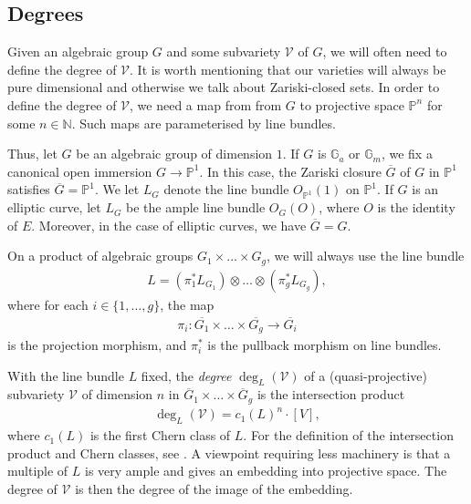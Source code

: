 \documentclass[12pt, reqno]{amsart}
\newcommand{\G}{\mathbb{G}}
\renewcommand{\P}{\mathbb{P}}
\theoremstyle{remark}
\theoremstyle{definition}
\numberwithin{equation}{section}
\begin{document}
\subsection{Degrees}\label{degrees}

Given an algebraic group $G$ and some subvariety $\mathcal{V}$ of $G$, we will often need to define the degree of $\mathcal{V}$. It is worth mentioning that our varieties will always be pure dimensional and otherwise we talk about Zariski-closed sets. In order to define the degree of $\mathcal{V}$, we need a map from from $G$ to projective space $\mathbb{P}^n$ for some $n \in \mathbb{N}$. Such maps are parameterised by line bundles.

Thus, let $G$ be an algebraic group of dimension $1$. If $G$ is $\G_a$ or $\G_m$, we fix a canonical open immersion $G \to \P^1$. In this case, the Zariski closure $\overline{G}$ of $G$ in $\mathbb{P}^1$ satisfies $\overline{G} = \mathbb{P}^1$. We let $L_G$ denote the line bundle $O_{\P^1}(1)$ on $\P^1$. If $G$ is an elliptic curve, let $L_G$ be the ample line bundle $O_G(O)$, where $O$ is the identity of $E$. Moreover, in the case of elliptic curves, we have $\overline{G} = G$.


On a product of algebraic groups $G_1 \times \dots \times G_g$, we will always use the line bundle
\begin{align*}
  L=   (\pi_1^\ast L_{G_1}) \otimes \dots \otimes
    (\pi_g^\ast L_{G_g}),
\end{align*}
where for each $i \in \{1, \dots, g\}$, the map
\begin{align*}
    \pi_i : \overline{G_1} \times
    \dots \times
    \overline{G_g} \to \overline{G_i}
\end{align*}
is the projection morphism, and $\pi_i^\ast$ is the pullback morphism on line bundles. 

With the line bundle $L$ fixed, the \emph{degree} $\deg_L(\mathcal{V})$ of a (quasi-projective) subvariety $\mathcal{V}$ of dimension $n$ in $\overline{G}_1 \times \dots \times \overline{G}_g$ is the intersection product 
\begin{align*}
    \deg_L(\mathcal{V}) = c_1(L)^n \cdot [V],
\end{align*}
where $c_1(L)$ is the first Chern class of $L$. For the definition of the intersection product and Chern classes, see \cite[Chapter 2.5]{Fulton}. A viewpoint requiring less machinery is that a multiple of $L$ is very ample and gives an embedding into projective space. The degree of $\mathcal{V}$ is then the degree of the image of the embedding. 
\end{document}
